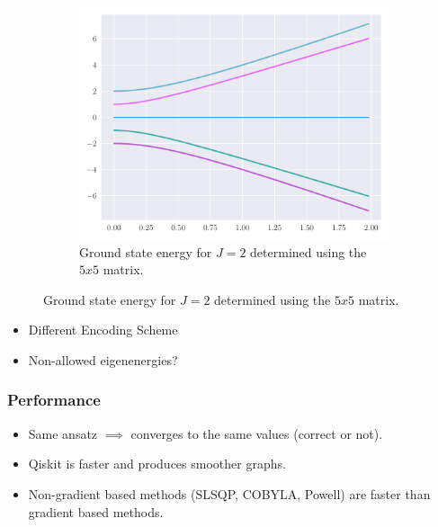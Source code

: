 \documentclass{beamer}
\begin{document}
\begin{frame}[t]
\begin{figure}[ht]
\begin{subfigure}[b]{0.45\textwidth}
\begin{center}
			\includegraphics[width=\textwidth]{../src/plots/Eigen-5.pdf}	
		\end{center}
		\caption{Ground state energy for $ J=2 $  determined using the $ 5x5 $ matrix.}
		\label{fig:2-qb-all}
		\end{subfigure}
		\label{fig:2-qb}
	\end{figure}

	\begin{itemize}
		\item Different Encoding Scheme
		\item Non-allowed eigenenergies?
	\end{itemize}
\end{frame}

\begin{frame}[t]
	\frametitle{Performance}
	\begin{itemize}
		\item Same ansatz $ \implies $ converges to the same values (correct or not).
		\item Qiskit is faster and produces smoother graphs. 
		\item Non-gradient based methods (SLSQP, COBYLA, Powell) are faster than gradient based methods.
	\end{itemize}
	
\end{frame}
\end{document}
